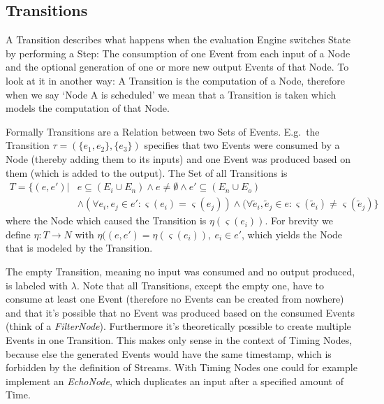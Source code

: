 \subsection{Transitions}
\label{sec:concepts:def:transitions}

A Transition describes what happens when the evaluation Engine switches State by performing a Step:
The consumption of one Event from each input of a Node and the optional generation of one or more new output Events of that Node.
To look at it in another way: A Transition is the computation of a Node, therefore when we say `Node A is scheduled' we mean that a Transition is taken which models the computation of that Node.

Formally Transitions are a Relation between two Sets of Events.
E.g.\ the Transition \(\tau = (\{e_1,e_2\}, \{e_3\})\) specifies that two Events were consumed by a Node (thereby adding them to its inputs) and one Event was produced based on them (which is added to the output).
The Set of all Transitions is
\begin{align*}
  T = \{(e, e') | &e \subseteq (E_i \cup E_n) \land e \neq \emptyset \land e' \subseteq (E_n \cup E_o)\\
                  &\land (\forall e_i, e_j \in e': \varsigma(e_i) = \varsigma(e_j)) \land (\forall \widetilde{e}_i, \widetilde{e}_j \in e: \varsigma(\widetilde{e}_i) \neq \varsigma(\widetilde{e}_j)\}
\end{align*}
where the Node which caused the Transition is \(\eta(\varsigma(e_i))\).
For brevity we define \(\eta : T \rightarrow N\) with \(\eta((e, e') = \eta(\varsigma(e_i)),\ e_i \in e'\), which yields the Node that is modeled by the Transition.

The empty Transition, meaning no input was consumed and no output produced, is labeled with \(\lambda\).
Note that all Transitions, except the empty one, have to consume at least one Event (therefore no Events can be created from nowhere) and that it's possible that no Event was produced based on the consumed Events (think of a \emph{FilterNode}).
Furthermore it's theoretically possible to create multiple Events in one Transition.
This makes only sense in the context of Timing Nodes, because else the generated Events would have the same timestamp, which is forbidden by the definition of Streams.
With Timing Nodes one could for example implement an \emph{EchoNode}, which duplicates an input after a specified amount of Time.

